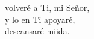 \begin{cancion}%
	 volveré a Ti, mi Señor,\\
	y lo en Ti apoyaré,\\
	descansaré miida.\\
\end{cancion}%

